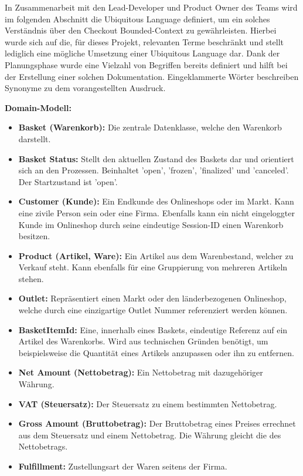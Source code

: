 In Zusammenarbeit mit den Lead-Developer und \Gls{Product Owner} des Teams wird im folgenden Abschnitt die Ubiquitous Language definiert, um ein solches Verständnis über den Checkout Bounded-Context zu gewährleisten. Hierbei wurde sich auf die, für dieses Projekt, relevanten Terme beschränkt und stellt lediglich eine mögliche Umsetzung einer Ubiquitous Language dar. Dank der Planungsphase wurde eine Vielzahl von Begriffen bereits definiert und hilft bei der Erstellung einer solchen Dokumentation. Eingeklammerte Wörter beschreiben Synonyme zu dem vorangestellten Ausdruck.

{\large \textbf{Domain-Modell:}}
\begin{itemize}
	\item \textbf{Basket (Warenkorb): } {Die zentrale Datenklasse, welche den Warenkorb darstellt.}
	\item \textbf{Basket Status: } {Stellt den aktuellen Zustand des Baskets dar und orientiert sich an den Prozessen. Beinhaltet 'open', 'frozen', 'finalized' und 'canceled'. Der Startzustand ist 'open'.}
	\item \textbf{Customer (Kunde): } {Ein Endkunde des Onlineshops oder im Markt. Kann eine zivile Person sein oder eine Firma. Ebenfalls kann ein nicht eingeloggter Kunde im Onlineshop durch seine eindeutige Session-ID einen Warenkorb besitzen.} 
	\item \textbf{Product (Artikel, Ware): } {Ein Artikel aus dem Warenbestand, welcher zu Verkauf steht. Kann ebenfalls für eine Gruppierung von mehreren Artikeln stehen.}
	\item \textbf{Outlet: } {Repräsentiert einen Markt oder den länderbezogenen Onlineshop, welche durch eine einzigartige Outlet Nummer referenziert werden können.}
	\item \textbf{BasketItemId: } {Eine, innerhalb eines Baskets, eindeutige Referenz auf ein Artikel des Warenkorbs. Wird aus technischen Gründen benötigt, um beispielsweise die Quantität eines Artikels anzupassen oder ihn zu entfernen.}
	\item \textbf{Net Amount (Nettobetrag): } {Ein Nettobetrag mit dazugehöriger Währung.}
	\item \textbf{VAT (Steuersatz): } {Der Steuersatz zu einem bestimmten Nettobetrag.}
	\item \textbf{Gross Amount (Bruttobetrag): } {Der Bruttobetrag eines Preises errechnet aus dem Steuersatz und einem Nettobetrag. Die Währung gleicht die des Nettobetrags.}
	\item \textbf{Fulfillment: } {Zustellungsart der Waren seitens der Firma.}

\end{itemize}
